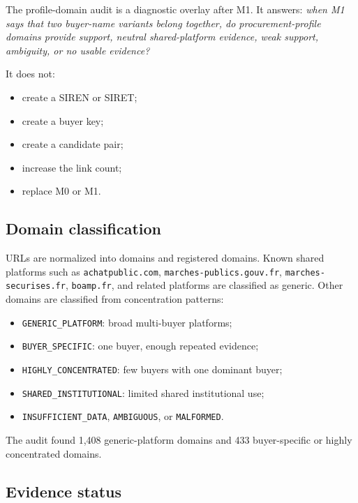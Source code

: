 \documentclass[11pt]{article}
\begin{document}
The profile-domain audit is a diagnostic overlay after M1. It answers:
\emph{when M1 says that two buyer-name variants belong together, do
procurement-profile domains provide support, neutral shared-platform
evidence, weak support, ambiguity, or no usable evidence?}

It does not:

\begin{itemize}
  \item create a SIREN or SIRET;
  \item create a buyer key;
  \item create a candidate pair;
  \item increase the link count;
  \item replace M0 or M1.
\end{itemize}

\subsection{Domain classification}

URLs are normalized into domains and registered domains. Known shared
platforms such as \texttt{achatpublic.com},
\texttt{marches-publics.gouv.fr}, \texttt{marches-securises.fr},
\texttt{boamp.fr}, and related platforms are classified as generic. Other
domains are classified from concentration patterns:

\begin{itemize}
  \item \texttt{GENERIC\_PLATFORM}: broad multi-buyer platforms;
  \item \texttt{BUYER\_SPECIFIC}: one buyer, enough repeated evidence;
  \item \texttt{HIGHLY\_CONCENTRATED}: few buyers with one dominant buyer;
  \item \texttt{SHARED\_INSTITUTIONAL}: limited shared institutional use;
  \item \texttt{INSUFFICIENT\_DATA}, \texttt{AMBIGUOUS}, or
        \texttt{MALFORMED}.
\end{itemize}

The audit found 1,408 generic-platform domains and 433 buyer-specific or
highly concentrated domains.

\subsection{Evidence status}
\end{document}
